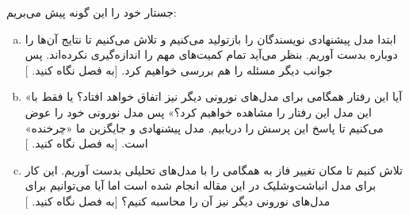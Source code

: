
جستار خود را این گونه پیش می‌بریم:
\begin{enumerate}[(a)]
	\item
	ابتدا مدل پیشنهادی نویسندگان \cite{PhysRevLett.105.158104} را بازتولید می‌کنیم و تلاش می‌کنیم تا نتایج آن‌ها را دوباره بدست آوریم. بنظر می‌آید تمام کمیت‌های مهم را اندازه‌گیری نکرده‌اند. پس جوانب دیگر مسئله را هم بررسی خواهیم کرد. [به فصل 
	نگاه کنید.
	]
	\item 
	«آیا این رفتار همگامی برای مدل‌های نورونی دیگر نیز اتفاق خواهد افتاد؟ یا فقط با این مدل این رفتار را مشاهده خواهیم کرد؟» پس مدل نورونی خود را عوض می‌کنیم تا پاسخ این پرسش را دریابیم. مدل پیشنهادی و جایگزین ما «چرخنده» است. [به فصل 
	نگاه کنید.
	]
	\item 
	تلاش کنیم تا مکان تغییر فاز به همگامی را با مدل‌های تحلیلی بدست آوریم. این کار برای مدل انباشت‌وشلیک در این مقاله 
	\cite{brunel2000dynamics}
	انجام شده است اما آیا می‌توانیم برای مدل‌های نورونی دیگر نیز آن را محاسبه کنیم؟ [به فصل 
	نگاه کنید.
	]
\end{enumerate}
